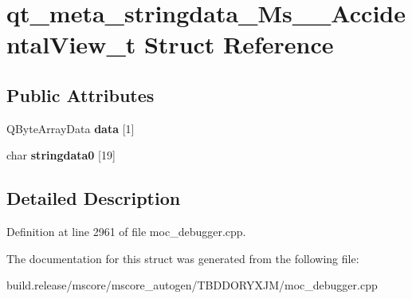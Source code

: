 \hypertarget{structqt__meta__stringdata___ms_____accidental_view__t}{}\section{qt\+\_\+meta\+\_\+stringdata\+\_\+\+Ms\+\_\+\+\_\+\+Accidental\+View\+\_\+t Struct Reference}
\label{structqt__meta__stringdata___ms_____accidental_view__t}
\subsection*{Public Attributes}
\begin{DoxyCompactItemize}
\item 
\mbox{\label{structqt__meta__stringdata___ms_____accidental_view__t_a2e2769181b0ac6e11bbf51d501f6245a}} 
Q\+Byte\+Array\+Data {\bfseries data} \mbox{[}1\mbox{]}
\item 
\mbox{\label{structqt__meta__stringdata___ms_____accidental_view__t_ab9b5672845c95f8863c831adc1ea68d9}} 
char {\bfseries stringdata0} \mbox{[}19\mbox{]}
\end{DoxyCompactItemize}


\subsection{Detailed Description}


Definition at line 2961 of file moc\+\_\+debugger.\+cpp.



The documentation for this struct was generated from the following file\+:\begin{DoxyCompactItemize}
\item 
build.\+release/mscore/mscore\+\_\+autogen/\+T\+B\+D\+D\+O\+R\+Y\+X\+J\+M/moc\+\_\+debugger.\+cpp\end{DoxyCompactItemize}
